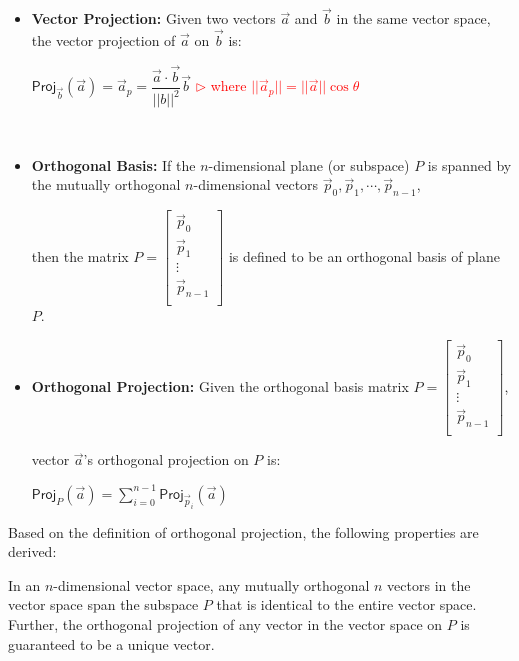 \begin{tcolorbox}[title={\textbf{\tboxdef{\ref*{subsec:projection}} Vector and Orthogonal Projections}}]

\begin{itemize}

\item \textbf{Vector Projection:} Given two vectors $\vec{a}$ and $\vec{b}$ in the same vector space, the vector projection of $\vec{a}$ on $\vec{b}$ is:

$\textsf{Proj}_{\vec{b}}(\vec{a}) = \vec{a}_p  = \dfrac{\vec{a} \cdot \vec{b}}{||b||^2} \vec{b}$ \textcolor{red}{ $\rhd$ where $||\vec{a}_p|| = ||\vec{a}|| \cos \theta$}

$ $

\item \textbf{Orthogonal Basis:} If the $n$-dimensional plane (or subspace) $P$ is spanned by the mutually orthogonal $n$-dimensional vectors $\vec{p}_0, \vec{p}_1, \cdots, \vec{p}_{n-1}$, 

then the matrix $P = \begin{bmatrix} 
\vec{p}_0\\
\vec{p}_1\\
\vdots\\
\vec{p}_{n-1}\\
\end{bmatrix}
$
is defined to be an orthogonal basis of plane $P$. 


\item \textbf{Orthogonal Projection:} Given the orthogonal basis matrix $P = \begin{bmatrix} 
\vec{p}_0\\
\vec{p}_1\\
\vdots\\
\vec{p}_{n-1}\\
\end{bmatrix}
$, 

vector $\vec{a}$'s orthogonal projection on $P$ is:

$\textsf{Proj}_P(\vec{a}) = \sum\limits_{i=0}^{n-1} \textsf{Proj}_{\vec{p}_i}(\vec{a})$



\end{itemize}


\end{tcolorbox}


Based on the definition of orthogonal projection, the following properties are derived:  

 In an $n$-dimensional vector space, any mutually orthogonal $n$ vectors in the vector space span the subspace $P$ that is identical to the entire vector space. Further, the orthogonal projection of any vector in the vector space on $P$ is guaranteed to be a unique vector.

